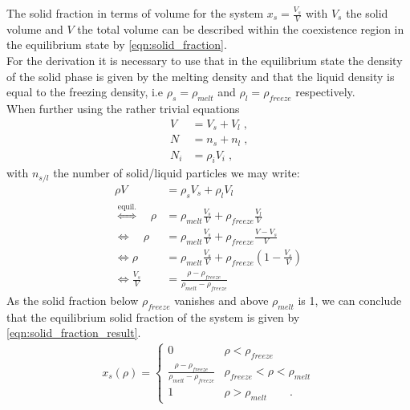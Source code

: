 The solid fraction in terms of volume for the system $x_s = \frac{V_s}{V}$ with $V_s$ the solid volume and $V$ the total volume can be described within the coexistence region in the equilibrium state by \autoref{eqn:solid_fraction}.\\ 
For the derivation it is necessary to use that in the equilibrium state the density of the solid phase is given by the melting density and that the liquid density is equal to the freezing density, i.e $\rho_s = \rho_{melt}$ and $\rho_l = \rho_{freeze}$ respectively.\\
When further using the rather trivial equations
\begin{align}
V &= V_s + V_l \; \text{,} \nonumber\\
N &= n_s + n_l \; \text{,} \nonumber\\
N_i &= \rho_i V_i \; \text{,} 
\end{align}
with $n_{s/l}$ the number of solid/liquid particles we may write:
\begin{align}
\label{eqn:solid_fraction}
\rho V &= \rho_s V_s + \rho_l V_l \nonumber\\
\stackrel{\text{equil.}}{\Leftrightarrow} \quad \rho &= \rho_{melt} \frac{V_s}{V} + \rho_{freeze} \frac{V_l}{V} \nonumber \\
\Leftrightarrow \quad \rho &= \rho_{melt} \frac{V_s}{V} + \rho_{freeze} \frac{V - V_s}{V} \nonumber \\
\Leftrightarrow \rho &= \rho_{melt} \frac{V_s}{V} + \rho_{freeze} \left( 1- \frac{V_s}{V} \right) \nonumber \\
\Leftrightarrow \frac{V_s}{V} &= \frac{\rho - \rho_{freeze}}{\rho_{melt} - \rho_{freeze} } 
\end{align}
As the solid fraction below $\rho_{freeze} $ vanishes and above $\rho_{melt}$ is 1, we can conclude that the equilibrium solid fraction of the system is given by \autoref{eqn:solid_fraction_result}.
\begin{align}
\label{eqn:solid_fraction_result}
x_s(\rho) = 
\begin{cases}
0 & \rho <  \rho_{freeze}\\
\frac{\rho-\rho_{freeze}}{\rho_{melt}-\rho_{freeze}} &  \rho_{freeze} < \rho <  \rho_{melt}\\ 
1 &  \rho > \rho_{melt} \quad \quad \text{.}
\end{cases}
\end{align}

